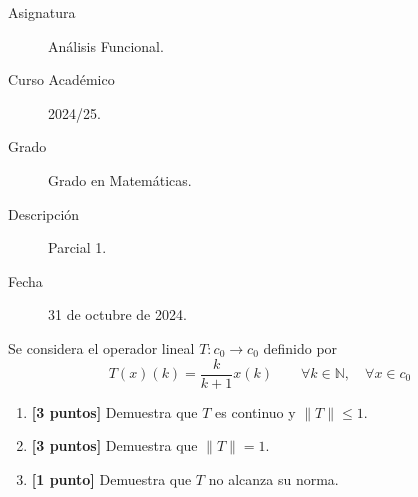 \documentclass[12pt]{article}
\begin{document}

    
    

    \begin{description}
        \item[Asignatura] Análisis Funcional.
        \item[Curso Académico] 2024/25.
        \item[Grado] Grado en Matemáticas.
        \item[Descripción] Parcial 1.
        \item[Fecha] 31 de octubre de 2024.
    
    \end{description}
    \newpage


    
    \begin{ejercicio}[7 puntos]
        Se considera el operador lineal $T:c_0\to c_0$ definido por
        \begin{equation*}
            T(x)(k) = \frac{k}{k+1}x(k) \qquad \forall k\in \mathbb{N}, \quad \forall x\in c_0
        \end{equation*}
        \begin{enumerate}[label=\alph*)]
            \item \textbf{[3 puntos]} Demuestra que $T$ es continuo y $\|T\|\leq 1$.
            \item \textbf{[3 puntos]} Demuestra que $\|T\| = 1$.
            \item \textbf{[1 punto]} Demuestra que $T$ no alcanza su norma.
        \end{enumerate}
    \end{ejercicio}
\end{document}
